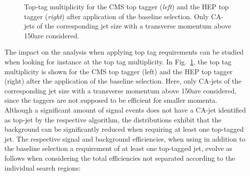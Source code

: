 \begin{figure}[!t]
  \centering
{}
  \caption{Top-tag multiplicity for the CMS top tagger (\textit{left}) and the HEP top tagger (\textit{right}) after application of the baseline selection. Only CA-jets of the corresponding jet size with a transverse momentum above 150\gev are considered.}
  \label{fig:stop_top_tag_multi}
\end{figure} 
The impact on the analysis when applying top tag requirements can be studied when looking for instance at the top tag multiplicity. In Fig.~\ref{fig:stop_top_tag_multi}, the top tag multiplicity is shown for the CMS top tagger (left) and the HEP top tagger (right) after the application of the baseline selection. Here, only CA-jets of the corresponding jet size with a transverse momentum above 150\gev are considered, since the taggers are not supposed to be efficient for smaller momenta. \\
Although a significant amount of signal events does not have a CA-jet identified as top-jet by the respective algorithm, the distributions exhibit that the background can be significantly reduced when requiring at least one top-tagged jet. The respective signal and background efficiencies, when using in addition to the baseline selection a requirement of at least one top-tagged jet, evolve as follows when considering the total efficiencies not separated according to the individual search regions:
